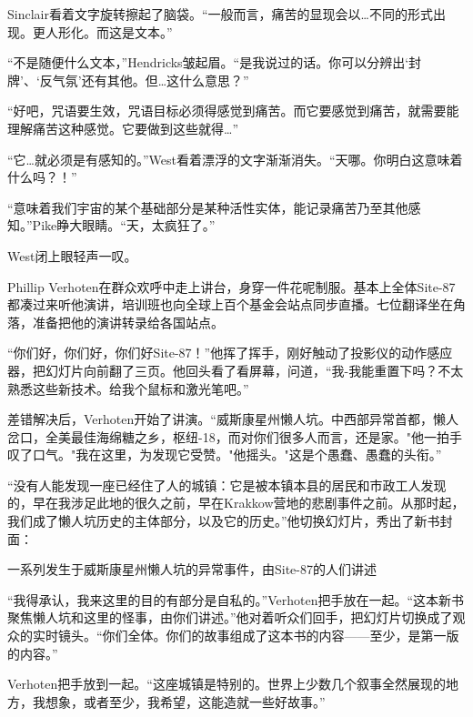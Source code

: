 Sinclair看着文字旋转擦起了脑袋。“一般而言，痛苦的显现会以…不同的形式出现。更人形化。而这是文本。”

“不是随便什么文本，”Hendricks皱起眉。“是我说过的话。你可以分辨出‘封牌’、‘反气氛’还有其他。但…这什么意思？”

“好吧，咒语要生效，咒语目标必须得感觉到痛苦。而它要感觉到痛苦，就需要能理解痛苦这种感觉。它要做到这些就得…”

“它…就必须是有感知的。”West看着漂浮的文字渐渐消失。“天哪。你明白这意味着什么吗？！”

“意味着我们宇宙的某个基础部分是某种活性实体，能记录痛苦乃至其他感知。”Pike睁大眼睛。“天，太疯狂了。”

West闭上眼轻声一叹。

\hr

Phillip Verhoten在群众欢呼中走上讲台，身穿一件花呢制服。基本上全体Site-87都凑过来听他演讲，培训班也向全球上百个基金会站点同步直播。七位翻译坐在角落，准备把他的演讲转录给各国站点。

“你们好，你们好，你们好Site-87！”他挥了挥手，刚好触动了投影仪的动作感应器，把幻灯片向前翻了三页。他回头看了看屏幕，问道，“我-我能重置下吗？不太熟悉这些新技术。给我个鼠标和激光笔吧。”

差错解决后，Verhoten开始了讲演。“威斯康星州懒人坑。中西部异常首都，懒人岔口，全美最佳海绵糖之乡，枢纽-18，而对你们很多人而言，还是家。"他一拍手叹了口气。"我在这里，为发现它受赞。"他摇头。"这是个愚蠢、愚蠢的头衔。”

“没有人能发现一座已经住了人的城镇：它是被本镇本县的居民和市政工人发现的，早在我涉足此地的很久之前，早在Krakkow营地的悲剧事件之前。从那时起，我们成了懒人坑历史的主体部分，以及它的历史。”他切换幻灯片，秀出了新书封面：

\begin{scpbox}


一系列发生于威斯康星州懒人坑的异常事件，由Site-87的人们讲述

\end{scpbox}

“我得承认，我来这里的目的有部分是自私的。”Verhoten把手放在一起。“这本新书聚焦懒人坑和这里的怪事，由你们讲述。”他对着听众们回手，把幻灯片切换成了观众的实时镜头。“你们全体。你们的故事组成了这本书的内容——至少，是第一版的内容。”

Verhoten把手放到一起。“这座城镇是特别的。世界上少数几个叙事全然展现的地方，我想象，或者至少，我希望，这能造就一些好故事。”

